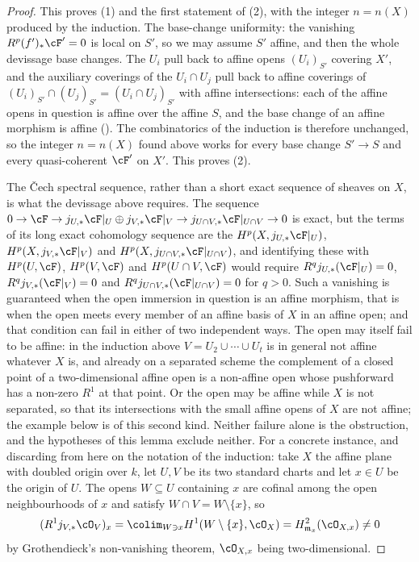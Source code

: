 \begin{proof}
This proves (1) and the first statement of (2), with the integer
$n=n(X)$ produced by the induction.
The base-change uniformity: the vanishing $R^p(f')_*\cF'=0$ is local
on $S'$, so we may assume $S'$ affine, and then the whole devissage
base changes.  The $U_i$ pull back to affine opens $(U_i)_{S'}$
covering $X'$, and the auxiliary coverings of the $U_i\cap U_j$ pull
back to affine coverings of
$(U_i)_{S'}\cap(U_j)_{S'}=(U_i\cap U_j)_{S'}$ with affine
intersections: each of the affine opens in question is affine over the
affine $S$, and the base change of an affine morphism is affine
().  The combinatorics of the
induction is therefore unchanged, so the integer $n=n(X)$ found above
works for every base change $S'\to S$ and every quasi-coherent $\cF'$
on $X'$.  This proves (2).

The Čech spectral sequence, rather than a short exact sequence of
sheaves on $X$, is what the devissage above requires.  The sequence
$0\to\cF\to j_{U,*}\cF|_U\oplus j_{V,*}\cF|_V\to
j_{U\cap V,*}\cF|_{U\cap V}\to0$ is exact, but the terms of its long
exact cohomology sequence are the $H^p(X,j_{U,*}\cF|_U)$,
$H^p(X,j_{V,*}\cF|_V)$ and $H^p(X,j_{U\cap V,*}\cF|_{U\cap V})$, and
identifying these with $H^p(U,\cF)$, $H^p(V,\cF)$ and
$H^p(U\cap V,\cF)$ would require $R^qj_{U,*}(\cF|_U)=0$,
$R^qj_{V,*}(\cF|_V)=0$ and $R^qj_{U\cap V,*}(\cF|_{U\cap V})=0$ for
$q>0$.  Such a vanishing is guaranteed when the open immersion in
question is an affine morphism, that is when the open meets every
member of an affine basis of $X$ in an affine open; and that condition
can fail in either of two independent ways.  The open may itself fail
to be affine: in the induction above $V=U_2\cup\cdots\cup U_t$ is in
general not affine whatever $X$ is, and already on a separated scheme
the complement of a closed point of a two-dimensional affine open is a
non-affine open whose pushforward has a non-zero $R^1$ at that point.
Or the open may be affine while $X$ is not separated, so that its
intersections with the small affine opens of $X$ are not affine; the
example below is of this second kind.  Neither failure alone is the
obstruction, and the hypotheses of this lemma exclude neither.  For a
concrete instance, and discarding from here on the notation of the
induction: take $X$ the affine plane with doubled origin over $k$, let
$U,V$ be its two standard charts and let $x\in U$ be the origin of $U$.
The opens $W\subseteq U$ containing $x$ are cofinal among the open
neighbourhoods of $x$ and satisfy
$W\cap V=W\setminus\{x\}$, so
\[
(R^1j_{V,*}\cO_V)_x=\colim_{W\ni x}H^1(W\setminus\{x\},\cO_X)
=H^2_{\mathfrak m_x}(\cO_{X,x})\ne0
\]
by Grothendieck's non-vanishing theorem, $\cO_{X,x}$ being
two-dimensional.
\end{proof}




